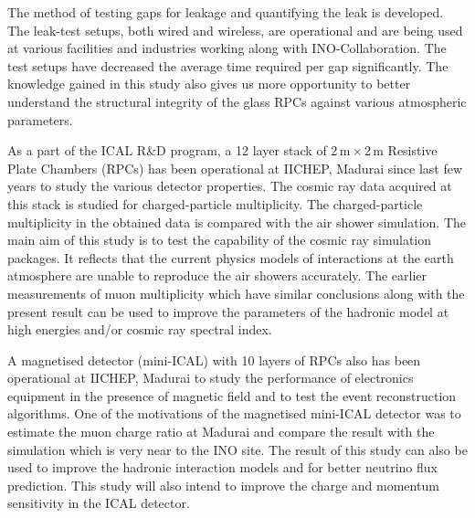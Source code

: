 \documentclass[a4paper,12pt,twoside,openany]{article}
\begin{document}
The method of testing gaps for leakage and quantifying the leak is developed. The leak-test setups, both wired and wireless, are operational and are being used at various facilities and industries working along with INO-Collaboration. The test setups have decreased the average time required per gap significantly. The knowledge gained in this study also gives us more opportunity to better understand the structural integrity of the glass RPCs against various atmospheric parameters.

As a part of the ICAL R\&D program, a 12 layer stack of 2\,m\,$\times$\,2\,m Resistive Plate Chambers (RPCs) has been operational at IICHEP, Madurai since last few years to study the various detector properties. The cosmic ray data acquired at this stack is studied for charged-particle multiplicity. The charged-particle multiplicity in the obtained data is compared with the air shower simulation. The main aim of this study is to test the capability of the cosmic ray simulation packages. It reflects that the current physics models of interactions at the earth atmosphere are unable to reproduce the air showers accurately. The earlier measurements of muon multiplicity which have similar conclusions along with the present result can be used to improve the parameters of the hadronic model at high energies and/or cosmic ray spectral index.

A magnetised detector (mini-ICAL) with 10 layers of RPCs also has been operational at IICHEP, Madurai to study the performance of electronics equipment in the presence of magnetic field and to test the event reconstruction algorithms. One of the motivations of the magnetised mini-ICAL detector was to estimate the muon charge ratio at Madurai and compare the result with the simulation which is very near to the INO site. The result of this study can also be used to improve the hadronic interaction models and for better neutrino flux prediction. This study will also intend to improve the charge and momentum sensitivity in the ICAL detector.
\end{document}

